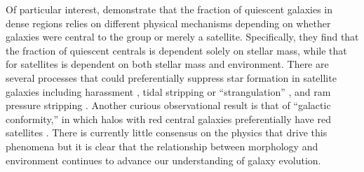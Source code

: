Of particular interest, \cite{Peng2010} demonstrate that the fraction of quiescent galaxies in dense regions relies on different physical mechanisms depending on whether galaxies were central to the group or merely a satellite. Specifically, they find that the fraction of quiescent centrals is dependent solely on stellar mass, while that for satellites is dependent on both stellar mass and environment. There are several processes that could preferentially suppress star formation in satellite galaxies including harassment \citep{Moore1996}, tidal stripping or ``strangulation'' \citep{Kawata2008}, and ram pressure stripping \citep{Gunn1972}. Another curious observational result is that of ``galactic conformity,'' in which halos with red central galaxies preferentially have red satellites \citep{Weinmann2006}. There is currently little consensus on the physics that drive this phenomena \citep{Kauffmann2013,Hearin2015,Hearin2016,Pahwa2017} but it is clear that the relationship between morphology and environment continues to advance our understanding of galaxy evolution.



